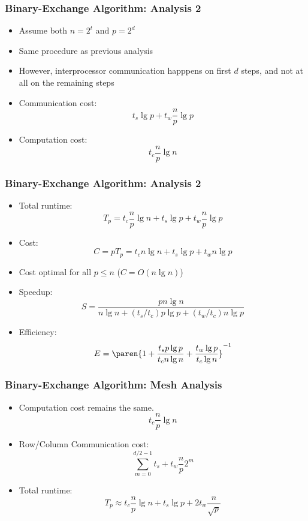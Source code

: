 \documentclass[xcolor=pdftex,dvipsnames,table]{presentation}
\begin{document}
\begin{frame}
	\frametitle{Binary-Exchange Algorithm: Analysis 2}

	\begin{itemize}
		\item Assume both $n=2^t$ and $p=2^d$
		\item Same procedure as previous analysis
		\item However, interprocessor communication happpens on first $d$ steps, and not at all on the remaining steps
		\item Communication cost:
		\[
			t_s\lg p+ t_w\frac{n}{p}\lg p
		\]
		\item Computation cost:
		\[
			t_c\frac{n}{p}\lg n
		\]
	\end{itemize}
\end{frame}

\begin{frame}
	\frametitle{Binary-Exchange Algorithm: Analysis 2}

	\begin{itemize}
		\item Total runtime:
		\[
			T_p = t_c\frac{n}{p}\lg n + t_s\lg p+ t_w\frac{n}{p}\lg p
		\]
		\item Cost:
		\[
			C=pT_p=t_c n\lg n +t_s \lg p +t_w n\lg p
		\]
		\item Cost optimal for all $p\leq n$ ($C=O(n\lg n)$)
		\item Speedup:
		\[
			S=\frac{pn\lg n}{n\lg n+(t_s/t_c)p\lg p+(t_w/t_c)n\lg p}
		\]
		\item Efficiency:
		\[
			E=\paren{1+\frac{t_sp\lg p}{t_c n\lg n}+\frac{t_w\lg p}{t_c\lg n}}^{-1}
		\]
	\end{itemize}
\end{frame}

\begin{frame}
	\frametitle{Binary-Exchange Algorithm: Mesh Analysis}

	\begin{itemize}
		\item Computation cost remains the same.
		\[
			t_c\frac{n}{p}\lg n
		\]
		\item Row/Column Communication cost:
		\[
			\sum_{m=0}^{d/2-1} t_s+t_w\frac{n}{p}2^m
		\]
		\item Total runtime:
		\[
			T_p \approx t_c\frac{n}{p}\lg n+ t_s\lg p +2t_w\frac{n}{\sqrt{p}}
		\]
	\end{itemize}
\end{frame}
\end{document}
